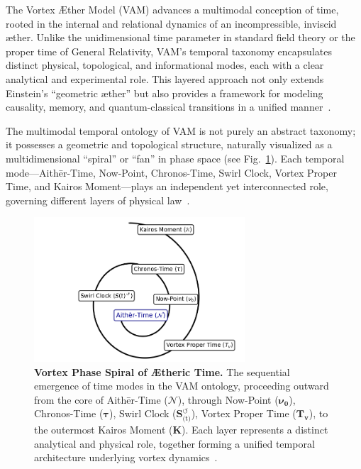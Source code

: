 The Vortex Æther Model (VAM) advances a multimodal conception of time, rooted in the internal and relational dynamics of an incompressible, inviscid æther. Unlike the unidimensional time parameter in standard field theory or the proper time of General Relativity, VAM’s temporal taxonomy encapsulates distinct physical, topological, and informational modes, each with a clear analytical and experimental role. This layered approach not only extends Einstein’s “geometric æther” but also provides a framework for modeling causality, memory, and quantum-classical transitions in a unified manner~\cite{VAM-8, VAM-13, VAM-15}.

The multimodal temporal ontology of VAM is not purely an abstract taxonomy; it possesses a geometric and topological structure, naturally visualized as a multidimensional “spiral” or “fan” in phase space (see Fig.~\ref{fig:temporal_ontology}). Each temporal mode—Aithēr-Time, Now-Point, Chronos-Time, Swirl Clock, Vortex Proper Time, and Kairos Moment—plays an independent yet interconnected role, governing different layers of physical law~\cite{VAM-8, VAM-13}.

\begin{figure}[H]
    \centering
    \includegraphics[width=0.7\textwidth]{TemporalOntology}
    \caption{
        \textbf{Vortex Phase Spiral of Ætheric Time.}
        The sequential emergence of time modes in the VAM ontology, proceeding outward from the core of Aithēr-Time ($\boldsymbol{\mathcal{N}}$), through Now-Point ($\boldsymbol{\nu_0}$), Chronos-Time ($\boldsymbol{\tau}$), Swirl Clock ($\boldsymbol{S}^{\boldsymbol{\circlearrowleft}}_\text{(t)}$), Vortex Proper Time ($\boldsymbol{T_v}$), to the outermost Kairos Moment ($\mathbb{\boldsymbol{K}}$). Each layer represents a distinct analytical and physical role, together forming a unified temporal architecture underlying vortex dynamics~\cite{VAM-8, VAM-13}.
    }
    \label{fig:temporal_ontology}
\end{figure}

